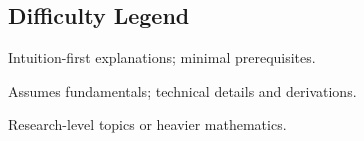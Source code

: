 \subsection*{Difficulty Legend}

\begin{description}[leftmargin=2.2em,labelsep=0.6em]
  \item[\difficultyBeginner\ Beginner] Intuition-first explanations; minimal prerequisites.
  \item[\difficultyIntermediate\ Intermediate] Assumes fundamentals; technical details and derivations.
  \item[\difficultyAdvanced\ Advanced] Research-level topics or heavier mathematics.
\end{description}
